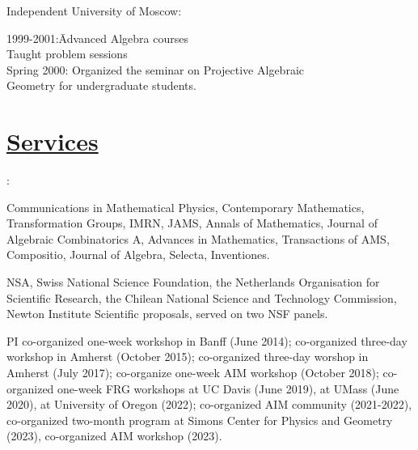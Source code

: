 \documentclass[11pt]{amsart}
\theoremstyle{plain}
\theoremstyle{definition}
\theoremstyle{remark}
\begin{document}
\medskip
\noindent Independent University of Moscow:
\begin{tabbing}
1999-2001:\quad\quad\quad\=  Advanced Algebra courses\\ \> Taught
problem sessions\\
Spring 2000: \>Organized the seminar  on Projective Algebraic\\
\>Geometry for undergraduate students.
\end{tabbing}











\section*{\Large \underline{Services}}

:

\medskip

\medskip

 Communications in Mathematical Physics, Contemporary
Mathematics, Transformation Groups, IMRN, JAMS, Annals of Mathematics, Journal of Algebraic Combinatorics A, Advances in Mathematics, Transactions of AMS, Compositio, Journal of Algebra, Selecta, Inventiones.
\medskip  

 NSA, Swiss National Science Foundation,
 the Netherlands Organisation for Scientific Research, the Chilean National Science and Technology Commission,
Newton Institute Scientific proposals, served on two NSF panels.


\medskip

PI co-organized one-week workshop in Banff (June 2014); co-organized three-day workshop in Amherst (October 2015); co-organized
three-day worshop in Amherst (July 2017); co-organize one-week AIM workshop (October 2018); co-organized one-week FRG workshops
at UC Davis (June 2019), at UMass (June 2020), at University of Oregon (2022); co-organized AIM community (2021-2022),
co-organized two-month program at Simons Center for Physics and Geometry (2023), co-organized AIM workshop (2023).

\medskip

\medskip


\medskip
\end{document}
